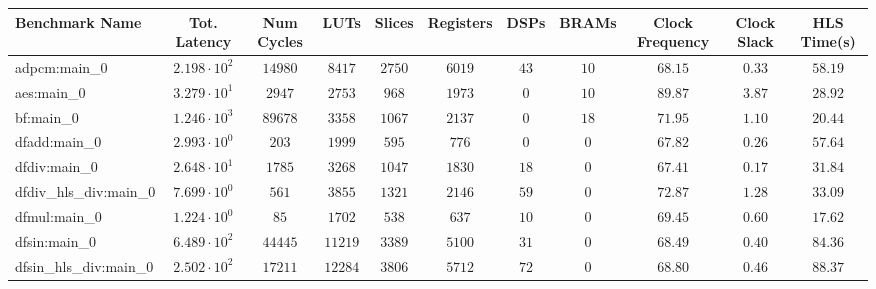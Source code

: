 \begin{tabular}{|l|c|c|c|c|c|c|c|c|c|c|}
\hline
Benchmark Name          & Tot. Latency           & Num Cycles & LUTs      & Slices    & Registers & DSPs    & BRAMs   & Clock Frequency & Clock Slack & HLS Time(s) \\
\hline
adpcm:main\_0           & $ 2.198 \cdot 10^{2} $ & $ 14980  $ & $ 8417  $ & $ 2750  $ & $ 6019  $ & $ 43  $ & $ 10  $ & $ 68.15       $ & $ 0.33    $ & $ 58.19   $ \\
aes:main\_0             & $ 3.279 \cdot 10^{1} $ & $ 2947   $ & $ 2753  $ & $ 968   $ & $ 1973  $ & $ 0   $ & $ 10  $ & $ 89.87       $ & $ 3.87    $ & $ 28.92   $ \\
bf:main\_0              & $ 1.246 \cdot 10^{3} $ & $ 89678  $ & $ 3358  $ & $ 1067  $ & $ 2137  $ & $ 0   $ & $ 18  $ & $ 71.95       $ & $ 1.10    $ & $ 20.44   $ \\
dfadd:main\_0           & $ 2.993 \cdot 10^{0} $ & $ 203    $ & $ 1999  $ & $ 595   $ & $ 776   $ & $ 0   $ & $ 0   $ & $ 67.82       $ & $ 0.26    $ & $ 57.64   $ \\
dfdiv:main\_0           & $ 2.648 \cdot 10^{1} $ & $ 1785   $ & $ 3268  $ & $ 1047  $ & $ 1830  $ & $ 18  $ & $ 0   $ & $ 67.41       $ & $ 0.17    $ & $ 31.84   $ \\
dfdiv\_hls\_div:main\_0 & $ 7.699 \cdot 10^{0} $ & $ 561    $ & $ 3855  $ & $ 1321  $ & $ 2146  $ & $ 59  $ & $ 0   $ & $ 72.87       $ & $ 1.28    $ & $ 33.09   $ \\
dfmul:main\_0           & $ 1.224 \cdot 10^{0} $ & $ 85     $ & $ 1702  $ & $ 538   $ & $ 637   $ & $ 10  $ & $ 0   $ & $ 69.45       $ & $ 0.60    $ & $ 17.62   $ \\
dfsin:main\_0           & $ 6.489 \cdot 10^{2} $ & $ 44445  $ & $ 11219 $ & $ 3389  $ & $ 5100  $ & $ 31  $ & $ 0   $ & $ 68.49       $ & $ 0.40    $ & $ 84.36   $ \\
dfsin\_hls\_div:main\_0 & $ 2.502 \cdot 10^{2} $ & $ 17211  $ & $ 12284 $ & $ 3806  $ & $ 5712  $ & $ 72  $ & $ 0   $ & $ 68.80       $ & $ 0.46    $ & $ 88.37   $ \\

\end{tabular}
